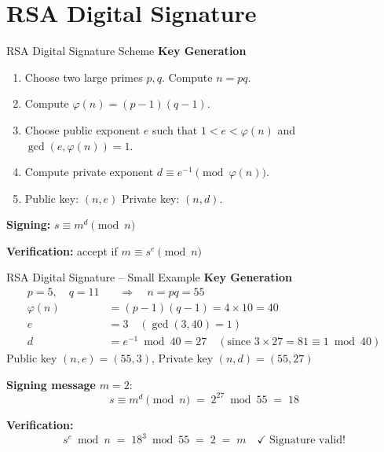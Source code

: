 \documentclass[aspectratio=169]{beamer}
\begin{document}
\section{RSA Digital Signature}
\begin{frame}{RSA Digital Signature Scheme}
  \textbf{Key Generation}
  \begin{enumerate}
    \item Choose two large primes $p, q$. Compute $n = pq$.
    \item Compute $\varphi(n) = (p-1)(q-1)$.
    \item Choose public exponent $e$ such that $1 < e < \varphi(n)$ and $\gcd(e,\varphi(n))=1$.
    \item Compute private exponent $d \equiv e^{-1} \pmod{\varphi(n)}$.
    \item Public key: $(n,e)$ \quad Private key: $(n,d)$.
  \end{enumerate}
  \textbf{Signing:} \quad $s \equiv m^{d} \pmod{n}$

  \textbf{Verification:} \quad accept if \; $m \equiv s^{e} \pmod{n}$
\end{frame}

\begin{frame}{RSA Digital Signature -- Small Example}
  \textbf{Key Generation}
  \begin{align*}
    p = 5, \quad q = 11 &\quad\Rightarrow\quad n = pq = 55 \\
    \varphi(n) &= (p-1)(q-1) = 4 \times 10 = 40 \\
    e &= 3 \quad (\gcd(3,40)=1) \\
    d &= e^{-1} \bmod 40 = 27 \quad (\text{since } 3 \times 27 = 81 \equiv 1 \bmod 40)
  \end{align*}
  Public key $(n,e) = (55,3)$, \quad Private key $(n,d) = (55,27)$

  \textbf{Signing message} $m = 2$:
  \[
    s \equiv m^{d} \pmod n \;=\; 2^{27} \bmod 55 \;=\; 18
  \]

  \textbf{Verification:}
  \[
    s^{e} \bmod n \;=\; 18^{3} \bmod 55 \;=\; 2 \;=\; m \quad \checkmark \; \text{Signature valid!}
  \]
\end{frame}

\end{document}

